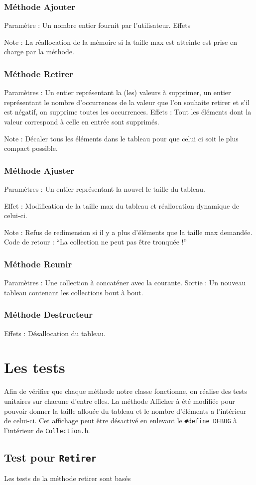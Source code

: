 \documentclass[11pt]{article}
\begin{document}
\subsubsection*{Méthode Ajouter}
Paramètre : Un nombre entier fournit par l’utilisateur.
Effets

\noindent Note : La réallocation de la mémoire si la taille max est atteinte est prise en charge par la méthode.

\subsubsection*{Méthode Retirer}
Paramètres : Un entier représentant la (les) valeurs à supprimer, un entier représentant le nombre d'occurrences de la valeur que l’on souhaite retirer et s’il est négatif, on supprime toutes les occurrences.
\noindent Effets : Tout les éléments dont la valeur correspond à celle en entrée sont supprimés.

\noindent Note : Décaler tous les éléments dans le tableau pour que celui ci soit le plus compact possible.

\subsubsection*{Méthode Ajuster}
Paramètres : Un entier représentant la nouvel le taille du tableau.

\noindent Effet : Modification de la taille max du tableau et réallocation dynamique de celui-ci.

\noindent Note : Refus de redimension si il y a plus d’éléments que la taille max demandée. Code de retour : “La collection ne peut pas être tronquée !”
    
\subsubsection*{Méthode Reunir}
Paramètres : Une collection à concaténer avec la courante.
\noindent Sortie : Un nouveau tableau contenant les collections bout à bout.

\subsubsection*{Méthode Destructeur}
\noindent Effets : Désallocation du tableau.

\section{Les tests}
Afin de vérifier que chaque méthode  notre classe fonctionne, on réalise des tests unitaires sur chacune d'entre elles. La méthode Afficher à été modifiée pour pouvoir donner la taille allouée du tableau et le nombre d'éléments a l'intérieur de celui-ci. Cet affichage peut être désactivé en enlevant le \texttt{\#define DEBUG} à l'intérieur de \texttt{Collection.h}.

\subsection{Test pour \tt Retirer}
Les tests de la méthode retirer sont basés 
\end{document}
